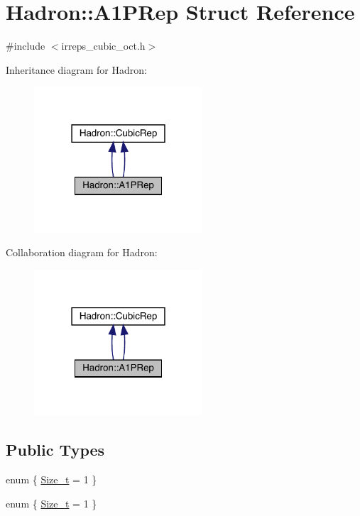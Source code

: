 \hypertarget{structHadron_1_1A1PRep}{}\section{Hadron\+:\+:A1\+P\+Rep Struct Reference}
\label{structHadron_1_1A1PRep}


{\ttfamily \#include $<$irreps\+\_\+cubic\+\_\+oct.\+h$>$}



Inheritance diagram for Hadron\+:\nopagebreak
\begin{figure}[H]
\begin{center}
\leavevmode
\includegraphics[width=178pt]{da/dff/structHadron_1_1A1PRep__inherit__graph}
\end{center}
\end{figure}


Collaboration diagram for Hadron\+:\nopagebreak
\begin{figure}[H]
\begin{center}
\leavevmode
\includegraphics[width=178pt]{df/d95/structHadron_1_1A1PRep__coll__graph}
\end{center}
\end{figure}
\subsection*{Public Types}
\begin{DoxyCompactItemize}
\item 
enum \{ \mbox{\hyperlink{structHadron_1_1A1PRep_a17f6d89444f8726a16c3ebc23f16092ba818391020c14366c5159f7b053a876fa}{Size\+\_\+t}} = 1
 \}
\item 
enum \{ \mbox{\hyperlink{structHadron_1_1A1PRep_a17f6d89444f8726a16c3ebc23f16092ba818391020c14366c5159f7b053a876fa}{Size\+\_\+t}} = 1
 \}
\end{DoxyCompactItemize}
